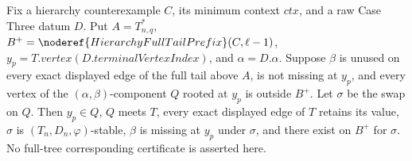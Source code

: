 \begin{lemma}
Fix a hierarchy counterexample $C$, its minimum context $\mathit{ctx}$,
and a raw Case Three datum $D$. Put $A=T^*_{n,q}$,
$B^+=\noderef{HierarchyFullTailPrefix}(C,\ell-1)$,
$y_p=T.\mathit{vertex}(D.\mathit{terminalVertexIndex})$, and
$\alpha=D.\alpha$. Suppose $\beta$ is unused on every exact displayed
edge of the full tail above $A$, is not missing at $y_p$, and every
vertex of the $(\alpha,\beta)$-component $Q$ rooted at $y_p$ is outside
$B^+$. Let $\sigma$ be the swap on $Q$. Then $y_p\in Q$, $Q$ meets $T$,
every exact displayed edge of $T$ retains its value, $\sigma$ is
$(T_n,D_n,\varphi)$-stable, $\beta$ is missing at $y_p$ under $\sigma$,
and there exist  on $B^+$ for $\sigma$.
No full-tree corresponding certificate is asserted here.
\end{lemma}
